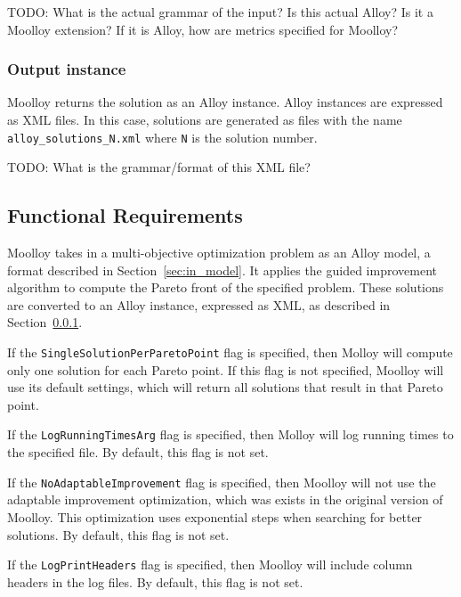 \documentclass[11pt]{article}
\theoremstyle{definition}
\begin{document}
TODO: What is the actual grammar of the input? Is this actual Alloy?
Is it a Moolloy extension? If it is Alloy, how are metrics specified for
Moolloy?

\subsubsection{Output instance}\label{sec:out_model}

Moolloy returns the solution as an Alloy instance. Alloy instances are
expressed as XML files. In this case, solutions are generated as files
with the name \texttt{alloy\_solutions\_N.xml} where \texttt{N} is the
solution number.

TODO: What is the grammar/format of this XML file?

\subsection{Functional Requirements}\label{sec:func_req}

Moolloy takes in a multi-objective optimization problem as an Alloy
model, a format described in Section~\ref{sec:in_model}. It applies the
guided improvement algorithm to compute the Pareto front of the
specified problem. These solutions are converted to an Alloy instance,
expressed as XML, as described in Section~\ref{sec:out_model}.

If the \texttt{SingleSolutionPerParetoPoint} flag is specified, then
Molloy will compute only one solution for each Pareto point. If this
flag is not specified, Moolloy will use its default settings, which
will return all solutions that result in that Pareto point.

If the \texttt{LogRunningTimesArg} flag is specified, then Molloy will
log running times to the specified file. By default, this flag is not
set.

If the \texttt{NoAdaptableImprovement} flag is specified, then Moolloy
will not use the adaptable improvement optimization, which was exists
in the original version of Moolloy. This optimization uses exponential
steps when searching for better solutions. By default, this flag is not
set.

If the \texttt{LogPrintHeaders} flag is specified, then Moolloy will
include column headers in the log files. By default, this flag is not
set.
\end{document}
